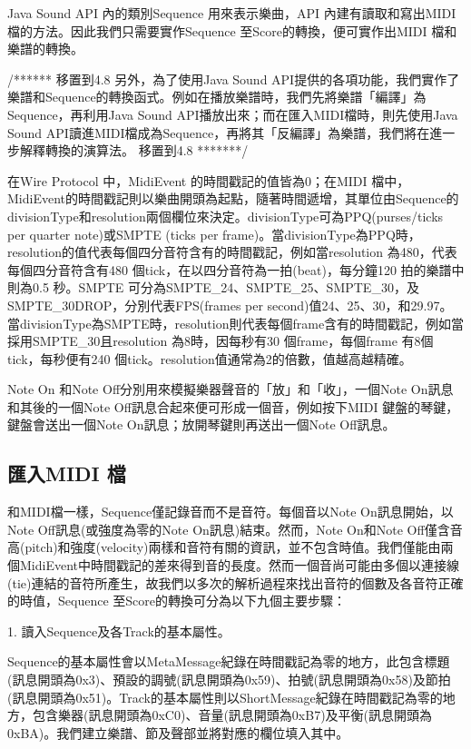 \documentclass[12pt,a4paper,oneside]{report}
\begin{document}
Java Sound API 內的類別Sequence 用來表示樂曲，API 內建有讀取和寫出MIDI檔的方法。因此我們只需要實作Sequence 至Score的轉換，便可實作出MIDI 檔和樂譜的轉換。

/******  移置到4.8  
另外，為了使用Java Sound API提供的各項功能，我們實作了樂譜和Sequence的轉換函式。例如在播放樂譜時，我們先將樂譜「編譯」為Sequence，再利用Java Sound API播放出來；而在匯入MIDI檔時，則先使用Java Sound API讀進MIDI檔成為Sequence，再將其「反編譯」為樂譜，我們將在進一步解釋轉換的演算法。
移置到4.8  *******/

在Wire Protocol 中，MidiEvent 的時間戳記的值皆為0；在MIDI 檔中，MidiEvent的時間戳記則以樂曲開頭為起點，隨著時間遞增，其單位由Sequence的divisionType和resolution兩個欄位來決定。divisionType可為PPQ(purses/ticks per quarter note)或SMPTE (ticks per frame)。當divisionType為PPQ時，resolution的值代表每個四分音符含有的時間戳記，例如當resolution 為480，代表每個四分音符含有480 個tick，在以四分音符為一拍(beat)，每分鐘120 拍的樂譜中則為0.5 秒。SMPTE 可分為SMPTE\_24、SMPTE\_25、SMPTE\_30，及SMPTE\_30DROP，分別代表FPS(frames per second)值24、25、30，和29.97。當divisionType為SMPTE時，resolution則代表每個frame含有的時間戳記，例如當採用SMPTE\_30且resolution 為8時，因每秒有30 個frame，每個frame 有8個tick，每秒便有240 個tick。resolution值通常為2的倍數，值越高越精確。

Note On 和Note Off分別用來模擬樂器聲音的「放」和「收」，一個Note On訊息和其後的一個Note Off訊息合起來便可形成一個音，例如按下MIDI 鍵盤的琴鍵，鍵盤會送出一個Note On訊息；放開琴鍵則再送出一個Note Off訊息。


\subsection{匯入MIDI 檔} %

和MIDI檔一樣，Sequence僅記錄音而不是音符。每個音以Note On訊息開始，以Note Off訊息(或強度為零的Note On訊息)結束。然而，Note On和Note Off僅含音高(pitch)和強度(velocity)兩樣和音符有關的資訊，並不包含時值。我們僅能由兩個MidiEvent中時間戳記的差來得到音的長度。然而一個音尚可能由多個以連接線(tie)連結的音符所產生，故我們以多次的解析過程來找出音符的個數及各音符正確的時值，Sequence 至Score的轉換可分為以下九個主要步驟： 

1. 讀入Sequence及各Track的基本屬性。 

Sequence的基本屬性會以MetaMessage紀錄在時間戳記為零的地方，此包含標題(訊息開頭為0x3)、預設的調號(訊息開頭為0x59)、拍號(訊息開頭為0x58)及節拍(訊息開頭為0x51)。Track的基本屬性則以ShortMessage紀錄在時間戳記為零的地方，包含樂器(訊息開頭為0xC0)、音量(訊息開頭為0xB7)及平衡(訊息開頭為0xBA)。我們建立樂譜、節及聲部並將對應的欄位填入其中。
\end{document}
